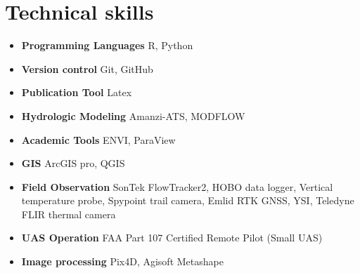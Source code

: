 \section{Technical skills}
\vspace{-1.5em}
\begin{itemize}
    \item[]{\faDesktop \hspace{0.3em} \textbf{Programming Languages} R, Python}
    \item[]{\faGithub \hspace{0.3em} \textbf{Version control} Git, GitHub}
    \item[]{\faBook \hspace{0.3em} \textbf{Publication Tool} Latex}
    \item[]{\faHSquare \hspace{0.3em} \textbf{Hydrologic Modeling}  Amanzi-ATS, MODFLOW}
    \item[]{\faChartBar  \hspace{0.3em} \textbf{Academic Tools} ENVI, ParaView}
    \item[]{\faCompass \hspace{0.3em} \textbf{GIS} ArcGIS pro, QGIS}
    \item[]{\faBinoculars \hspace{0.3em} \textbf{Field Observation} SonTek FlowTracker2, HOBO data logger, Vertical temperature probe, Spypoint trail camera, Emlid RTK GNSS, YSI, Teledyne FLIR thermal camera}
    \item[]{\faPlane \hspace{0.3em} \textbf{UAS Operation} FAA Part 107 Certified Remote Pilot (Small UAS)}
    \item[]{\faImages \hspace{0.3em} \textbf{Image processing} Pix4D, Agisoft Metashape}
\end{itemize}

\vspace{0.2em}
